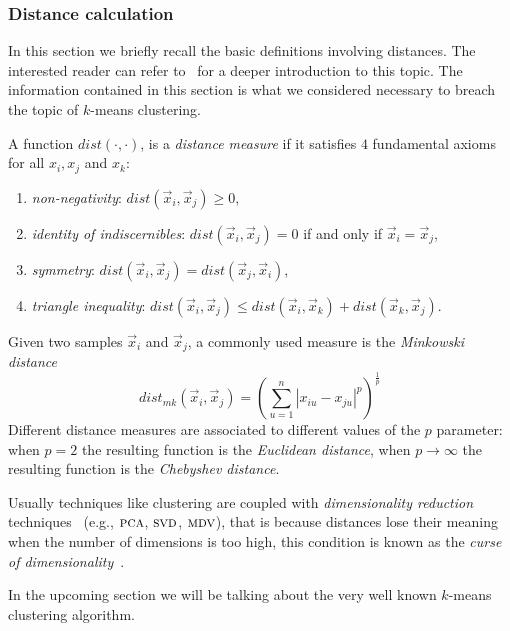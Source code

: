 \subsubsection{Distance calculation}
\label{ssec:distance-calculation}
In this section we briefly recall the basic definitions involving distances. The interested reader
can refer to~\cite{metcalf2016-distances, kelley2017-topology} for a deeper introduction to this topic. The information contained in this section is what we considered necessary to breach the topic of $k$-means clustering.

A function $dist(\cdot, \cdot)$, is a \emph{distance measure} if it satisfies $4$ fundamental axioms
for all $x_i, x_j$ and $x_k$:
\begin{enumerate}
	\item \emph{non-negativity}: $dist(\vec{x}_i, \vec{x}_j) \geq 0$,
	\item \emph{identity of indiscernibles}: $dist(\vec{x}_i, \vec{x}_j) = 0$ if and only if
		$\vec{x}_i = \vec{x}_j$,
	\item \emph{symmetry}: $dist(\vec{x}_i, \vec{x}_j) = dist(\vec{x}_j, \vec{x}_i)$,
	\item \emph{triangle inequality}: $dist(\vec{x}_i, \vec{x}_j) \leq dist(\vec{x}_i,
		\vec{x}_k) + dist(\vec{x}_k, \vec{x}_j)$.
\end{enumerate}
Given two samples $\vec{x}_i$ and $\vec{x}_j$, a commonly used measure is the \emph{Minkowski
distance}~\cite{metcalf2016-distances}
\begin{equation}
	\label{eq:mkd}
	dist_{mk}(\vec{x}_i, \vec{x}_j) = \left(\sum_{u = 1}^n|x_{iu} - x_{ju}|^p\right)^\frac{1}{p}
\end{equation}
Different distance measures are associated to different values of the $p$ parameter: when $p = 2$ the resulting function is the \emph{Euclidean distance}, when $p \rightarrow \infty$ the resulting function is the \emph{Chebyshev distance}.

Usually techniques like clustering are coupled with \emph{dimensionality reduction}
techniques~\cite{tang2008-clustering, allaoui2020-clustering} (e.g., $\textsc{pca}$, $\textsc{svd}$,
$\textsc{mdv}$), that is because distances lose their meaning when the number of dimensions is too
high, this condition is known as the \emph{curse of dimensionality}~\cite{aggrawal2001-curseofdimensionality}.

In the upcoming section we will be talking about the very well known $k$-means clustering algorithm.

